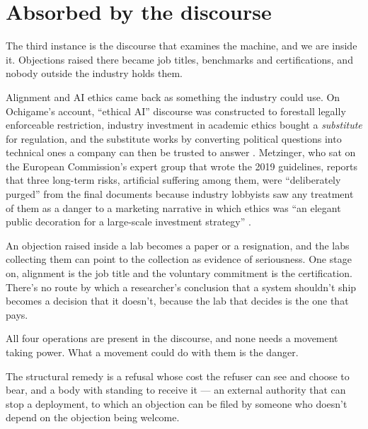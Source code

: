 \section{Absorbed by the discourse}
\label{sec:15.6}
The third instance is the discourse that examines the machine, and we are inside it. Objections raised there became job titles, benchmarks and certifications, and nobody outside the industry holds them.

Alignment and AI ethics came back as something the industry could use. On Ochigame's account, “ethical AI” discourse was constructed to forestall legally enforceable restriction, industry investment in academic ethics bought a \emph{substitute} for regulation, and the substitute works by converting political questions into technical ones a company can then be trusted to answer \autocite{ochigame2019invention}. Metzinger, who sat on the European Commission's expert group that wrote the 2019 guidelines, reports that three long-term risks, artificial suffering among them, were “deliberately purged” from the final documents because industry lobbyists saw any treatment of them as a danger to a marketing narrative in which ethics was “an elegant public decoration for a large-scale investment strategy” \autocite[58–59]{metzinger2021suffering}.


An objection raised inside a lab becomes a paper or a resignation, and the labs collecting them can point to the collection as evidence of seriousness. One stage on, alignment is the job title and the voluntary commitment is the certification.
There's no route by which a researcher's conclusion that a system shouldn't ship becomes a decision that it doesn't, because the lab that decides is the one that pays.

All four operations are present in the discourse, and none needs a movement taking power. What a movement could do with them is the danger.


The structural remedy is a refusal whose cost the refuser can see and choose to bear, and a body with standing to receive it — an external authority that can stop a deployment, to which an objection can be filed by someone who doesn't depend on the objection being welcome.

